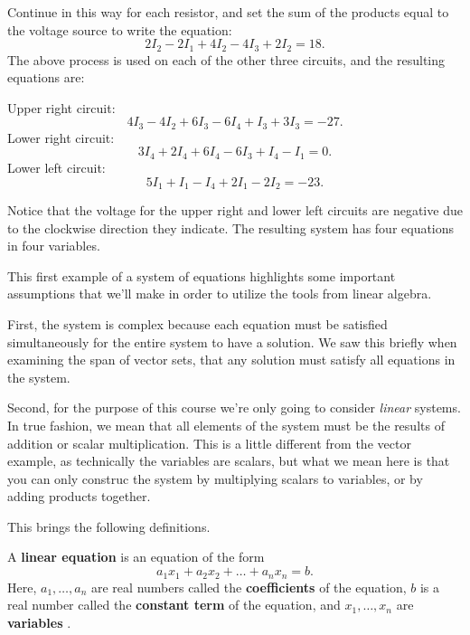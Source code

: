 \documentclass{ximera}
\begin{document}
\begin{exploration}
\begin{example}
  Continue in this way for each
  resistor, and set the sum of the products equal to the voltage
  source to write the equation:
  \begin{equation*}
    2I_2-2I_1+4I_2-4I_3+2I_2=18.
  \end{equation*}
  The above process is used on each of the other three circuits, and
  the resulting equations are:

  \noindent
  Upper right circuit:
  \begin{equation*}
    4I_3 - 4I_2 + 6I_3 - 6I_4 + I_3 + 3I_3 = -27.
  \end{equation*}
  Lower right circuit:
  \begin{equation*}
    3I_4 + 2I_4 + 6I_4 - 6I_3 + I_4 - I_1 = 0.
  \end{equation*}
  Lower left circuit:
  \begin{equation*}
    5I_1+I_1-I_4+2I_1-2I_2=-23.
  \end{equation*}

  Notice that the voltage for the upper right and lower left circuits
  are negative due to the clockwise direction they indicate. The
  resulting system has four equations in four variables. 

  \begin{remark}

    This first example of a system of equations highlights some important assumptions that we'll make in order to utilize the tools from linear algebra.

    First, the system is complex because each equation must be satisfied simultaneously for the entire system to have a solution. We saw this briefly when examining the span of vector sets, that any solution must satisfy all equations in the system.

    Second, for the purpose of this course we're only going to consider \emph{linear} systems. In true fashion, we mean that all elements of the system must be the results of addition or scalar multiplication. This is a little different from the vector example, as technically the variables are scalars, but what we mean here is that you can only construc the system by multiplying scalars to variables, or by adding products together. 

    This brings the following definitions.

    \begin{definition}
      A \textbf{linear equation}%
       is an equation of the form
      \begin{equation*}
        a_1x_1 + a_2x_2 + \ldots + a_nx_n = b.
      \end{equation*}
      Here, $a_1,\ldots,a_n$ are real numbers called the
      \textbf{coefficients}%
       of the equation, $b$ is a real number called the
      \textbf{constant term}%
       of the equation, and $x_1,\ldots,x_n$ are
      \textbf{variables}%
      .
    \end{definition}


\end{remark}
\end{example}
\end{exploration}
\end{document}
